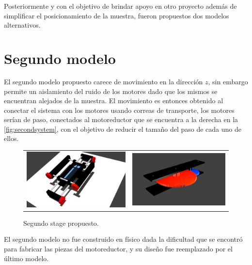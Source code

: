 Posteriormente y con el objetivo de brindar apoyo en otro proyecto además de simplificar el posicionamiento de la muestra, fueron propuestos dos modelos alternativos.

\section{Segundo modelo}
El segundo modelo propuesto carece de movimiento en la dirección $z$, sin embargo permite un aislamiento del ruido de los motores dado que los mismos se encuentran alejados de la muestra. El movimiento es entonces obtenido al conectar el sistema con los motores usando correas de transporte, los motores serían de paso, conectados al motoreductor que se encuentra a la derecha en la \autoref{fig:secondsystem}, con el objetivo de reducir el tamaño del paso de cada uno de ellos.
\begin{figure}[h]
	\centering
	\begin{tabular}{cc}
		\includegraphics[width=0.45\linewidth]{figures/system2.jpg} & 
		\includegraphics[width=0.45\linewidth]{figures/model2.png}
	\end{tabular}
	
	\caption{Segundo stage propuesto.}
	\label{fig:secondsystem}
\end{figure}

El segundo modelo no fue construido en físico dada la dificultad que se encontró para fabricar las piezas del motoreductor, y su diseño fue reemplazado por el último modelo.

\newpage
